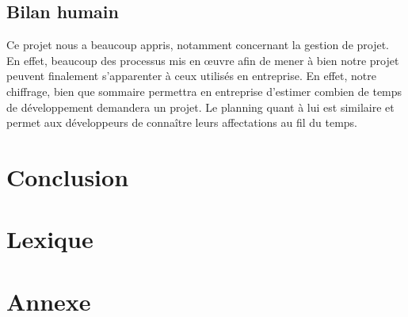 \documentclass[a4paper,11pt]{article}
\begin{document}
\subsection{Bilan humain}
Ce projet nous a beaucoup appris, notamment concernant la gestion de projet. En effet, beaucoup des processus mis en œuvre afin de mener à bien notre projet peuvent finalement s'apparenter à ceux utilisés en entreprise. En effet, notre chiffrage, bien que sommaire permettra en entreprise d'estimer combien de temps de développement demandera un projet. Le planning quant à lui est similaire et permet aux développeurs de connaître leurs affectations au fil du temps.

\section*{Conclusion}

\section*{Lexique}

\section*{Annexe}
\end{document}
